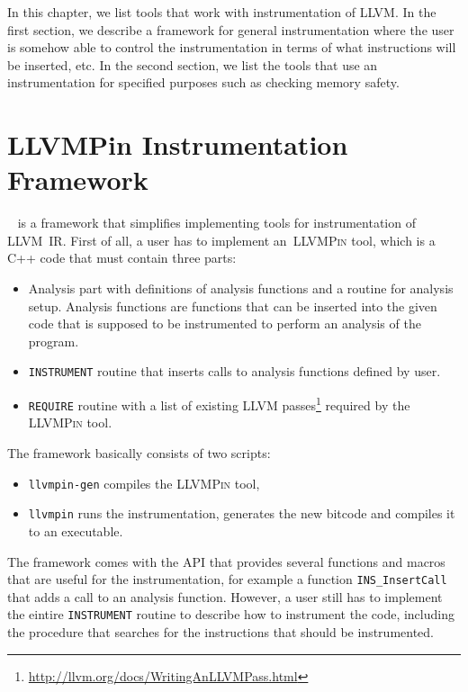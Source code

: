 In this chapter, we list tools that work with instrumentation of LLVM. In the
first section, we describe a framework for general instrumentation where the
user is somehow able to control the instrumentation in terms of what
instructions will be inserted, etc. In the second section, we list the tools
that use an instrumentation for specified purposes such as checking memory
safety.

\section{LLVMPin Instrumentation Framework}\label{sec:llvmpin}

\llvmpin~\cite{llvmpin} is a framework that simplifies implementing tools for
instrumentation of LLVM~IR. First of all, a user has to implement
an~\textsc{LLVMPin} tool, which is a C++ code that must contain three parts:

\begin{itemize}
    \item Analysis part with definitions of analysis functions and a routine
    for analysis setup. Analysis functions are functions that can be inserted
        into the given code that is supposed to be instrumented to perform an
        analysis of the program.
    \item \texttt{INSTRUMENT} routine that inserts calls to analysis functions
    defined by user.
    \item \texttt{REQUIRE} routine with a list of existing LLVM
    passes\footnote{\url{http://llvm.org/docs/WritingAnLLVMPass.html}} required
    by the \textsc{LLVMPin} tool.
\end{itemize}

The framework basically consists of two scripts:

\begin{itemize}
    \item \texttt{llvmpin-gen} compiles the \textsc{LLVMPin} tool,
    \item \texttt{llvmpin} runs the instrumentation, generates the new bitcode
    and compiles it to an executable.
\end{itemize}

The framework comes with the API that provides several functions and macros
that are useful for the instrumentation, for example a function
\texttt{INS\_InsertCall} that adds a call to an analysis function. However, a
user still has to implement the eintire \texttt{INSTRUMENT} routine to describe
how to instrument the code, including the procedure that searches for the
instructions that should be instrumented.

